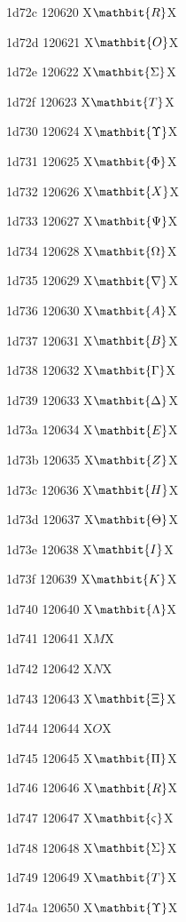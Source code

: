 \documentclass[11pt]{article}
\begin{document}
1d72c 120620 X{\ensuremath{\mathbit{R}}}X

1d72d 120621 X{\ensuremath{\mathbit{O}}}X

1d72e 120622 X{\ensuremath{\mathbit{\Sigma}}}X

1d72f 120623 X{\ensuremath{\mathbit{T}}}X

1d730 120624 X{\ensuremath{\mathbit{\Upsilon}}}X

1d731 120625 X{\ensuremath{\mathbit{\Phi}}}X

1d732 120626 X{\ensuremath{\mathbit{X}}}X

1d733 120627 X{\ensuremath{\mathbit{\Psi}}}X

1d734 120628 X{\ensuremath{\mathbit{\Omega}}}X

1d735 120629 X{\ensuremath{\mathbit{\nabla}}}X

1d736 120630 X{\ensuremath{\mathbit{A}}}X

1d737 120631 X{\ensuremath{\mathbit{B}}}X

1d738 120632 X{\ensuremath{\mathbit{\Gamma}}}X

1d739 120633 X{\ensuremath{\mathbit{\Delta}}}X

1d73a 120634 X{\ensuremath{\mathbit{E}}}X

1d73b 120635 X{\ensuremath{\mathbit{Z}}}X

1d73c 120636 X{\ensuremath{\mathbit{H}}}X

1d73d 120637 X{\ensuremath{\mathbit{\Theta}}}X

1d73e 120638 X{\ensuremath{\mathbit{I}}}X

1d73f 120639 X{\ensuremath{\mathbit{K}}}X

1d740 120640 X{\ensuremath{\mathbit{\Lambda}}}X

1d741 120641 X{\ensuremath{M}}X

1d742 120642 X{\ensuremath{N}}X

1d743 120643 X{\ensuremath{\mathbit{\Xi}}}X

1d744 120644 X{\ensuremath{O}}X

1d745 120645 X{\ensuremath{\mathbit{\Pi}}}X

1d746 120646 X{\ensuremath{\mathbit{R}}}X

1d747 120647 X{\ensuremath{\mathbit{\varsigma}}}X

1d748 120648 X{\ensuremath{\mathbit{\Sigma}}}X

1d749 120649 X{\ensuremath{\mathbit{T}}}X

1d74a 120650 X{\ensuremath{\mathbit{\Upsilon}}}X
\end{document}
